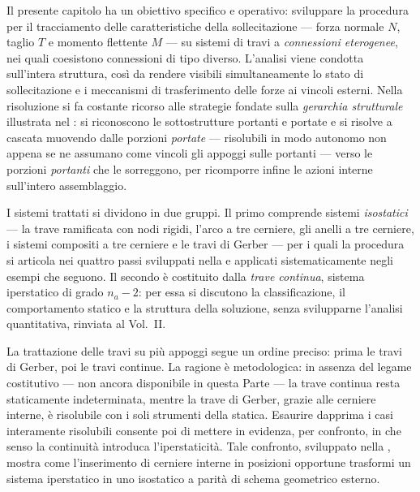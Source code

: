 Il presente capitolo ha un obiettivo specifico e
operativo: sviluppare la procedura per il tracciamento
delle caratteristiche della sollecitazione --- forza
normale $N$, taglio $T$ e momento flettente $M$ ---
su sistemi di travi a \emph{connessioni eterogenee},
nei quali coesistono connessioni di tipo diverso.
L'analisi viene condotta sull'intera struttura,
così da rendere visibili simultaneamente lo stato
di sollecitazione e i meccanismi di trasferimento
delle forze ai vincoli esterni. Nella risoluzione si fa costante ricorso alle strategie
fondate sulla \emph{gerarchia strutturale} illustrata nel
: si riconoscono le sottostrutture
portanti e portate e si risolve a cascata muovendo dalle
porzioni \emph{portate} --- risolubili in modo autonomo non
appena se ne assumano come vincoli gli appoggi sulle portanti
--- verso le porzioni \emph{portanti} che le sorreggono,
per ricomporre infine le azioni interne sull'intero
assemblaggio.

I sistemi trattati si dividono in due gruppi. Il primo
comprende sistemi \emph{isostatici} --- la trave ramificata
con nodi rigidi, l'arco a tre cerniere, gli anelli a tre
cerniere, i sistemi compositi a tre cerniere e le travi di
Gerber --- per i quali la procedura si articola nei quattro
passi sviluppati nella  e
applicati sistematicamente negli esempi che seguono.
Il secondo è costituito dalla \emph{trave continua}, sistema
iperstatico di grado $n_a - 2$: per essa si discutono la
classificazione, il comportamento statico e la struttura
della soluzione, senza svilupparne l'analisi quantitativa,
rinviata al Vol.~II.

La trattazione delle travi su più appoggi segue un ordine
preciso: prima le travi di Gerber, poi le travi continue.
La ragione è metodologica: in assenza del legame costitutivo
--- non ancora disponibile in questa Parte --- la trave
continua resta staticamente indeterminata, mentre la trave
di Gerber, grazie alle cerniere interne, è risolubile con i
soli strumenti della statica. Esaurire dapprima i casi
interamente risolubili consente poi di mettere in evidenza,
per confronto, in che senso la continuità introduca
l'iperstaticità. Tale confronto, sviluppato nella
, mostra come l'inserimento di
cerniere interne in posizioni opportune trasformi un sistema
iperstatico in uno isostatico a parità di schema geometrico
esterno.



